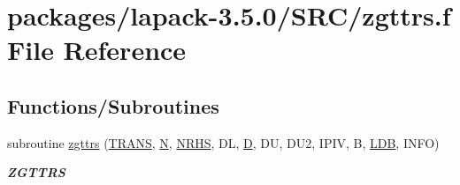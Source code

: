 \hypertarget{zgttrs_8f}{}\section{packages/lapack-\/3.5.0/\+S\+R\+C/zgttrs.f File Reference}
\label{zgttrs_8f}
\subsection*{Functions/\+Subroutines}
\begin{DoxyCompactItemize}
\item 
subroutine \hyperlink{group__complex16GTcomputational_ga5435936793916e289edd3a7322e770de}{zgttrs} (\hyperlink{superlu__enum__consts_8h_a0c4e17b2d5cea33f9991ccc6a6678d62a1f61e3015bfe0f0c2c3fda4c5a0cdf58}{T\+R\+A\+N\+S}, \hyperlink{polmisc_8c_a0240ac851181b84ac374872dc5434ee4}{N}, \hyperlink{example__user_8c_aa0138da002ce2a90360df2f521eb3198}{N\+R\+H\+S}, D\+L, \hyperlink{odrpack_8h_a7dae6ea403d00f3687f24a874e67d139}{D}, D\+U, D\+U2, I\+P\+I\+V, B, \hyperlink{example__user_8c_a50e90a7104df172b5a89a06c47fcca04}{L\+D\+B}, I\+N\+F\+O)
\begin{DoxyCompactList}\small\item\em {\bfseries Z\+G\+T\+T\+R\+S} \end{DoxyCompactList}\end{DoxyCompactItemize}
